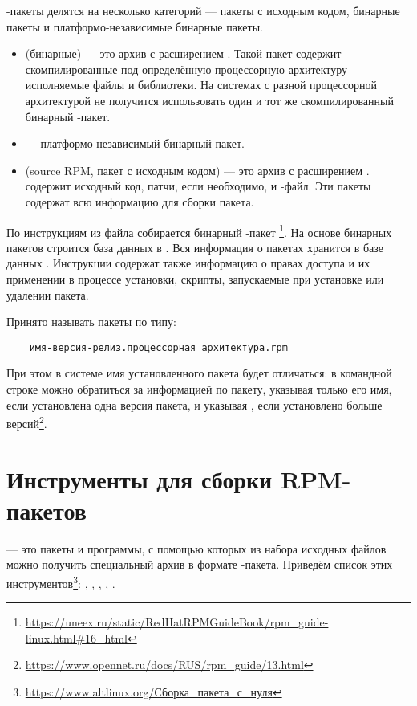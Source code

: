 -пакеты делятся на несколько категорий --- пакеты с исходным кодом, бинарные пакеты и платформо-независимые 
бинарные пакеты.
\begin{itemize}
	\item {} (бинарные) --- это архив с расширением . Такой пакет содержит 
		скомпилированные под определённую процессорную архитектуру исполняемые файлы и библиотеки. 
		На системах с разной процессорной архитектурой не получится использовать один и тот же 
		скомпилированный бинарный -пакет.
	\item {} --- платформо-независимый бинарный пакет.
	\item {} (source RPM, пакет с исходным кодом) --- это архив с расширением . 
		 содержит исходный код, патчи, если необходимо, и -файл. Эти пакеты содержат 
		всю информацию для сборки пакета.
\end{itemize}

По инструкциям из  файла собирается бинарный -пакет%
\footnote{\href{https://uneex.ru/static/RedHatRPMGuideBook/rpm_guide-linux.html\#16_html}{https://uneex.ru/static/RedHatRPMGuideBook/rpm\_guide-linux.html\#16\_html}}. 
На основе бинарных пакетов строится база данных в . Вся информация о пакетах хранится в базе 
данных . Инструкции содержат также информацию о правах доступа и их применении в процессе установки, 
скрипты, запускаемые при установке или удалении пакета.

Принято называть пакеты  по типу:
\begin{verbatim}
	имя-версия-релиз.процессорная_архитектура.rpm
\end{verbatim}

При этом в системе имя установленного пакета будет отличаться: в командной строке можно обратиться за информацией 
по пакету, указывая только его имя, если установлена одна версия пакета, и указывая , если 
установлено больше версий\footnote{\href{https://www.opennet.ru/docs/RUS/rpm_guide/13.html}{https://www.opennet.ru/docs/RUS/rpm\_guide/13.html}}.


\section{Инструменты для сборки RPM-пакетов}
 --- это пакеты и программы, с помощью которых из набора исходных файлов можно получить специальный архив в формате -пакета. Приведём список этих инструментов\footnote{\href{https://www.altlinux.org/\%D0\%A1\%D0\%B1\%D0\%BE\%D1\%80\%D0\%BA\%D0\%B0_\%D0\%BF\%D0\%B0\%D0\%BA\%D0\%B5\%D1\%82\%D0\%B0_\%D1\%81_\%D0\%BD\%D1\%83\%D0\%BB\%D1\%8F}{https://www.altlinux.org/Сборка\_пакета\_с\_нуля}}: , , , , . 

